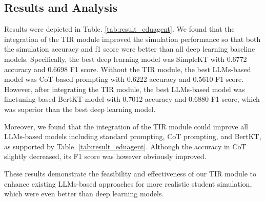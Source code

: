 \subsection{Results and Analysis}

Results were depicted in Table. \ref{tab:result_eduagent}. We found that the integration of the TIR module improved the simulation performance so that both the simulation accuracy and f1 score were better than all deep learning baseline models. Specifically, the best deep learning model was SimpleKT with 0.6772 accuracy and 0.6698 F1 score. Without the TIR module, the best LLMs-based model was CoT-based prompting with 0.6222 accuracy and 0.5610 F1 score. However, after integrating the TIR module, the best LLMs-based model was finetuning-based BertKT model with 0.7012 accuracy and 0.6880 F1 score, which was superior than the best deep learning model. 

Moreover, we found that the integration of the TIR module could improve all LLMs-based models including standard prompting, CoT prompting, and BertKT, as supported by Table. \ref{tab:result_eduagent}. Although the accuracy in CoT slightly decreased, its F1 score was however obviously improved. 

These results demonstrate the feasibility and effectiveness of our TIR module to enhance existing LLMs-based approaches for more realistic student simulation, which were even better than deep learning models.

